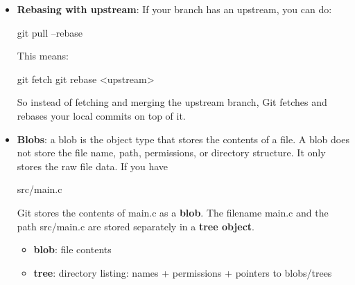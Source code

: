 \documentclass{report}
\begin{document}
\begin{itemize}
\begin{itemize}
                    The history looks linear, as if you started your feature branch from the latest main. Rebase is commonly used to keep a clean, linear history.
                    \bigbreak \noindent 
                    For example, before merging a feature branch, you might do:
                    \bigbreak \noindent 
                    \begin{bashcode}
                        git fetch origin
                        git rebase origin/main
                    \end{bashcode}
                    \bigbreak \noindent 
                    This updates your feature branch so your commits are placed after the newest commits on main.
            \end{itemize}

        \item \textbf{Rebasing with upstream}: If your branch has an upstream, you can do:
            \bigbreak \noindent 
            \begin{bashcode}
                git pull --rebase
            \end{bashcode}
            \bigbreak \noindent 
            This means:
            \bigbreak \noindent 
            \begin{bashcode}
                git fetch
                git rebase <upstream>
            \end{bashcode}
            \bigbreak \noindent 
            So instead of fetching and merging the upstream branch, Git fetches and rebases your local commits on top of it.
        \item \textbf{Blobs}: a blob is the object type that stores the contents of a file.
            \bigbreak \noindent 
            A blob does not store the file name, path, permissions, or directory structure. It only stores the raw file data.
            \bigbreak \noindent 
            If you have
            \bigbreak \noindent 
            \begin{bashcode}
                src/main.c
            \end{bashcode}
            \bigbreak \noindent 
            Git stores the contents of main.c as a \textbf{blob}. The filename main.c and the path src/main.c are stored separately in a \textbf{tree object}.
            \bigbreak \noindent 
            \begin{itemize}
                \item \textbf{blob}: file contents
                \item \textbf{tree}:  directory listing: names + permissions + pointers to blobs/trees

\end{itemize}
\end{itemize}
\end{document}
